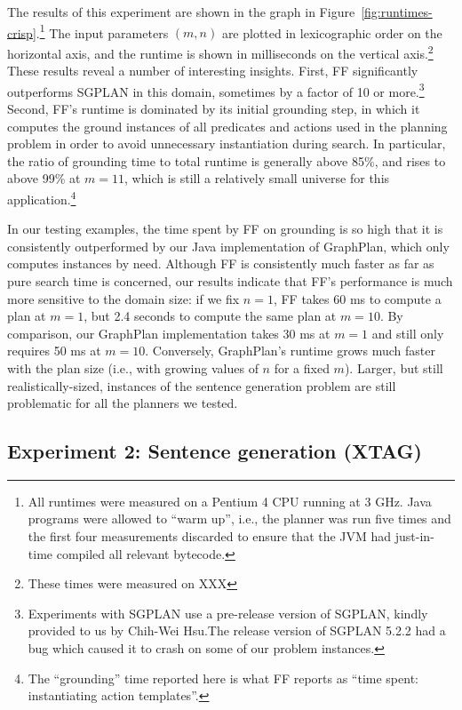 The results of this experiment are shown in the graph in
Figure~\ref{fig:runtimes-crisp}.\footnote{All
  runtimes were measured on a Pentium 4 CPU running at 3 GHz. Java programs
  were allowed to ``warm up'', i.e., the planner was run five times and the
  first four measurements discarded to ensure that the JVM had just-in-time
  compiled all relevant bytecode.} The input parameters $(m,n)$ are
plotted in lexicographic order on the horizontal axis, and the runtime
is shown in milliseconds on the vertical axis.\footnote{These times
  were measured on XXX} These results reveal a number of interesting
insights. First, FF significantly outperforms SGPLAN in this domain,
sometimes by a factor of 10 or more.\footnote{Experiments with SGPLAN
  use a pre-release version of SGPLAN, kindly provided to us by
  Chih-Wei Hsu.The release version of SGPLAN 5.2.2 had a bug which
  caused it to crash on some of our problem instances.}  Second, FF's
runtime is dominated by its initial grounding step, in which it
computes the ground instances of all predicates and actions used in
the planning problem in order to avoid unnecessary instantiation
during search.  In particular, the ratio of grounding time to total
runtime is generally above 85\%, and rises to above 99\% at $m=11$,
which is still a relatively small universe for this
application.\footnote{The ``grounding'' time reported here is what FF
  reports as ``time spent: instantiating action templates''.}

In our testing examples, the time spent by FF on grounding is so high
that it is consistently outperformed by our Java implementation of
GraphPlan, which only computes instances by need. Although FF is
consistently much faster as far as pure search time is concerned, our
results indicate that FF's performance is much more sensitive to the
domain size: if we fix $n=1$, FF takes 60 ms to compute a plan at
$m=1$, but 2.4 seconds to compute the same plan at $m=10$. By
comparison, our GraphPlan implementation takes 30 ms at $m=1$ and
still only requires 50 ms at $m=10$. Conversely, GraphPlan's runtime
grows much faster with the plan size (i.e., with growing values of $n$
for a fixed $m$). Larger, but still realistically-sized, instances of
the sentence generation problem are still problematic for all the
planners we tested.



\subsection{Experiment 2: Sentence generation (XTAG)}
\label{sec:exper-2:-sent-xtag}

